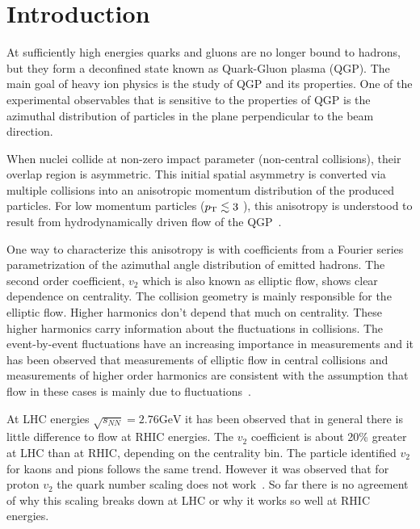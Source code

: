

\begin{abstract}

\end{abstract}
\tableofcontents
\listoffigures

\clearpage
\section{Introduction}
 At sufficiently high energies quarks and gluons are no longer bound to hadrons, but they form a deconfined state known as Quark-Gluon plasma (QGP). The main goal of heavy ion physics is the study of QGP and its properties.
One of the experimental observables that is sensitive to the properties of QGP is the azimuthal distribution of particles in the plane perpendicular to the beam direction. 

When nuclei collide at non-zero impact parameter (non-central collisions), their overlap region is asymmetric. This initial spatial asymmetry is converted via multiple collisions into an anisotropic momentum distribution of the produced particles. For low momentum particles ($p_{\rm T} \lesssim 3$ \gevc), this anisotropy is understood to result from hydrodynamically driven flow of the QGP~\cite{Adcox:2004mh, Adams:2005dq, Ollitrault:1992, Heinz:2002, Shuryak:2009}. 

One way to characterize this anisotropy is with coefficients from a Fourier series parametrization of the azimuthal angle distribution of emitted hadrons. The second order coefficient, $v_2$ which is also known as elliptic flow, shows clear dependence on centrality. The collision geometry is mainly responsible for the elliptic flow. Higher harmonics don't depend that much on centrality. These higher harmonics carry information about the fluctuations in collisions. The event-by-event fluctuations have an increasing importance in measurements and it has been observed that measurements of elliptic flow in central collisions and measurements of higher order harmonics are consistent with the assumption that flow in these cases is mainly due to fluctuations~\cite{Jia:2012ve}.



At LHC energies  $\sqrt{s_{NN}}=2.76\mathrm{GeV}$ it has been observed that in general there is little difference to flow at RHIC energies. The $v_2$ coefficient is about 20\% greater at LHC than at RHIC, depending on the centrality bin. 
The particle identified $v_2$ for kaons and pions follows the same trend. However it was observed that for proton $v_2$ the quark number scaling does not work~\cite{Lacey:2012ma}. So far there is no agreement of why this scaling breaks down at LHC or why it works so well at RHIC energies.

